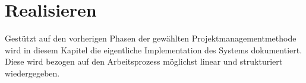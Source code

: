 \chapter{Realisieren} \label{ch:implement}

Gestützt auf den vorherigen Phasen der gewählten Projektmanagementmethode wird in diesem Kapitel die eigentliche Implementation des Systems dokumentiert.
Diese wird bezogen auf den Arbeitsprozess möglichst linear und strukturiert wiedergegeben.



\newpage



\newpage







\newpage





\newpage



\newpage







\newpage







